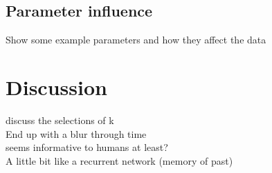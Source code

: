 \subsection{Parameter influence}
Show some example parameters and how they affect the data \\


\section{Discussion}

 discuss the selections of k \\
 End up with a blur through time \\
 seems informative to humans at least? \\
 A little bit like a recurrent network (memory of past) \\



